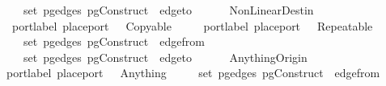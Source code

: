 \ \ \ {\isachardoublequoteopen}{\isasymnot}{\isacharparenleft}{\isasymexists}\ {\isasymin}\ set\ {\isacharparenleft}pg{\isacharunderscore}edges\ {\isacharparenleft}pgConstruct\ \ edge{\isacharunderscore}to\ \ {\isacharequal}\ \isanewline
\ \ {\isacharbar}\ {\isacharparenleft}NonLinear{\isacharunderscore}Destin{\isacharparenright}\isanewline
\ \ \ port{\isachardot}label\ {\isacharparenleft}place{\isacharunderscore}port\ \ {\isacharequal}\ Copyable\ \ {\isasymor}\isanewline
\ \ \ port{\isachardot}label\ {\isacharparenleft}place{\isacharunderscore}port\ \ {\isacharequal}\ Repeatable\ \isanewline
\ \ \ {\isachardoublequoteopen}{\isasymnot}{\isacharparenleft}{\isasymexists}\ {\isasymin}\ set\ {\isacharparenleft}pg{\isacharunderscore}edges\ {\isacharparenleft}pgConstruct\ \ edge{\isacharunderscore}from\ \ {\isacharequal}\ \isanewline
\ \ \ {\isachardoublequoteopen}{\isasymexists}{\isacharbang}\ {\isasymin}\ set\ {\isacharparenleft}pg{\isacharunderscore}edges\ {\isacharparenleft}pgConstruct\ \ edge{\isacharunderscore}to\ \ {\isacharequal}\ \isanewline
\ \ {\isacharbar}\ {\isacharparenleft}Anything{\isacharunderscore}Origin{\isacharparenright}\isanewline
\ \ port{\isachardot}label\ {\isacharparenleft}place{\isacharunderscore}port\ \ {\isacharequal}\ Anything{\isachardoublequoteclose}\isanewline
\ \ \ {\isachardoublequoteopen}{\isasymexists}{\isacharbang}\ {\isasymin}\ set\ {\isacharparenleft}pg{\isacharunderscore}edges\ {\isacharparenleft}pgConstruct\ \ edge{\isacharunderscore}from\ \ {\isacharequal}\ \isanewline
